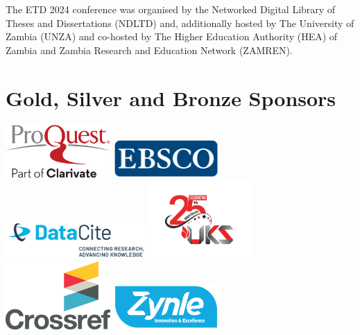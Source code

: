 \begin{center}
The ETD 2024 conference was organised by the Networked Digital Library of Theses and Dissertations (NDLTD) and, additionally hosted by The University of Zambia (UNZA) and co-hosted by The Higher Education Authority (HEA) of Zambia and Zambia Research and Education Network (ZAMREN).
\end{center}

\section{Gold, Silver and Bronze Sponsors}

\begin{center}
\includegraphics[width=0.30\textwidth]{images/logos/Partnerlogos/img-etd24-artwork-sponsors-proquest.png}
\includegraphics[width=0.30\textwidth]{images/logos/Partnerlogos/img-etd24-artwork-sponsors-ebsco.png}
\includegraphics[width=0.40\textwidth]{images/logos/Partnerlogos/img-etd24-artwork-sponsors-datacite.png}
\includegraphics[width=0.30\textwidth]{images/logos/Partnerlogos/img-etd24-artwork-sponsors-uks.png}
\includegraphics[width=0.30\textwidth]{images/logos/Partnerlogos/img-etd24-artwork-sponsors-crossref.jpg}
\includegraphics[width=0.30\textwidth]{images/logos/Partnerlogos/img-etd24-artwork-sponsors-zynle.png}
\end{center}



